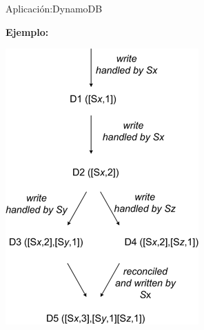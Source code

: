 \begin{frame}[fragile]{Aplicación:}{DynamoDB}
    \justifying

    {\bf Ejemplo:}\\[0.3cm]

\begin{center}
    \includegraphics[scale=0.5]{D1.png}
    \end{center}
\end{frame}
